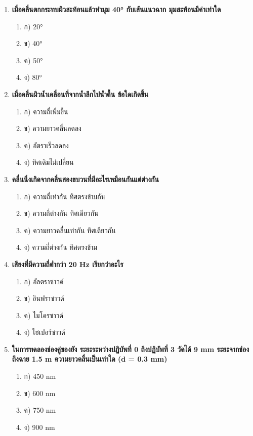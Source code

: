 \documentclass[12pt]{article}
\begin{document}
\begin{enumerate}
\begin{enumerate}
\item ค) 200 Hz - 2,000 Hz
\item ง) 2 Hz - 2,000 Hz
\end{enumerate}
\item \textbf{เมื่อคลื่นตกกระทบผิวสะท้อนแล้วทำมุม 40° กับเส้นแนวฉาก มุมสะท้อนมีค่าเท่าใด}
\begin{enumerate}
\item ก) 20°
\item ข) 40°
\item ค) 50°
\item ง) 80°
\end{enumerate}
\item \textbf{เมื่อคลื่นผิวน้ำเคลื่อนที่จากน้ำลึกไปน้ำตื้น ข้อใดเกิดขึ้น}
\begin{enumerate}
\item ก) ความถี่เพิ่มขึ้น
\item ข) ความยาวคลื่นลดลง
\item ค) อัตราเร็วลดลง
\item ง) ทิศเดิมไม่เปลี่ยน
\end{enumerate}
\item \textbf{คลื่นนิ่งเกิดจากคลื่นสองขบวนที่มีอะไรเหมือนกันแต่ต่างกัน}
\begin{enumerate}
\item ก) ความถี่เท่ากัน ทิศตรงข้ามกัน
\item ข) ความถี่ต่างกัน ทิศเดียวกัน
\item ค) ความยาวคลื่นเท่ากัน ทิศเดียวกัน
\item ง) ความถี่ต่างกัน ทิศตรงข้าม
\end{enumerate}
\item \textbf{เสียงที่มีความถี่ต่ำกว่า 20 Hz เรียกว่าอะไร}
\begin{enumerate}
\item ก) อัลตราซาวด์
\item ข) อินฟราซาวด์
\item ค) ไมโครซาวด์
\item ง) ไฮเปอร์ซาวด์
\end{enumerate}
\item \textbf{ในการทดลองช่องคู่ของยัง ระยะระหว่างปฏิบัพที่ 0 ถึงปฏิบัพที่ 3 วัดได้ 9 mm ระยะจากช่องถึงฉาย 1.5 m ความยาวคลื่นเป็นเท่าใด (d = 0.3 mm)}
\begin{enumerate}
\item ก) 450 nm
\item ข) 600 nm
\item ค) 750 nm
\item ง) 900 nm
\end{enumerate}

\end{enumerate}
\end{document}
